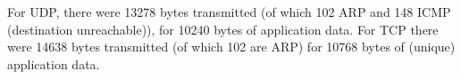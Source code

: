 For UDP, there were 13278 bytes transmitted (of which 102 ARP and 148 ICMP (destination unreachable)), for 10240 bytes of application data. For TCP there were 14638 bytes transmitted (of which 102 are ARP) for 10768 bytes of (unique) application data.